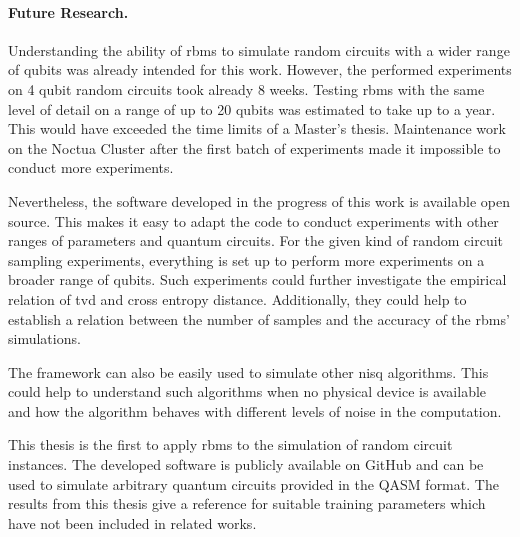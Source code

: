 \paragraph{Future Research.}
Understanding the ability of \gls{rbm}s to simulate random circuits with a wider range of qubits 
was already intended for this work. However, the performed experiments 
on 4 qubit random circuits took already 8 weeks. Testing \gls{rbm}s with the same 
level of detail on a range of up to 20 qubits was estimated to take up to 
a year. This would have exceeded the time limits of a Master's thesis. Maintenance work on the Noctua Cluster 
after the first batch of experiments made it impossible to conduct more experiments.

Nevertheless, the software developed in the progress of this work is available open source. 
This makes it easy to adapt the code to conduct experiments 
with other ranges of parameters and quantum circuits. For the given kind of random circuit 
sampling experiments, everything is set up to perform more experiments on a broader range of 
qubits. Such experiments could further investigate the empirical relation of \gls{tvd} and cross entropy 
distance. Additionally, they could help to establish a relation between the number of samples and 
the accuracy of the \gls{rbm}s' simulations.

The framework can also be easily used to simulate other \gls{nisq} algorithms. This could help to 
understand such algorithms when no physical device is available and how the algorithm
behaves with different levels of noise in the computation.

This thesis is the first to apply \gls{rbm}s to the simulation of random circuit instances. 
The developed software is publicly available on GitHub \cite{NQS2020} and can be used to simulate arbitrary quantum 
circuits provided in the QASM format. The results from 
this thesis give a reference for suitable training parameters which have not been included in related works.



